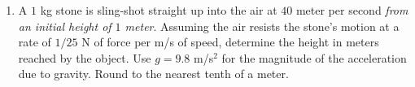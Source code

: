 \documentclass{ximera}
\begin{document}
\begin{enumerate}[label=(\arabic*)]




\item A $1$ kg stone is sling-shot straight up into the air at $40$ meter per second \emph{from an initial height of $1$ meter}.  Assuming the air resists the stone's motion at a rate of $1/25$ N of force per m/s of speed, determine the height in meters reached by the object.  Use $g=9.8$ m/s$^2$ for the magnitude of the acceleration due to gravity.  Round to the nearest tenth of a meter.





\end{enumerate}
\end{document}
